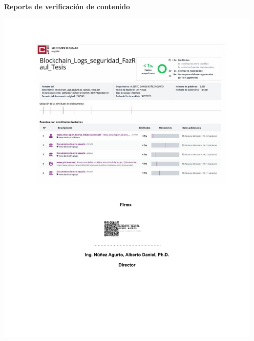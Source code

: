 \documentclass[letterpaper, 12pt, journal, oneside, onecolumn]{IEEEtran}
\begin{document}


\renewcommand{\tablename}{Tabla}


\thispagestyle{empty}
\newpage


\begin{center}
\textbf{Reporte de verificación de contenido}
\end{center}
\includegraphics[width=\textwidth,height=0.9\textheight,keepaspectratio]{figuras/RF_ReportePlagio.pdf}
\thispagestyle{empty}
\newpage


\newpage
\end{document}
